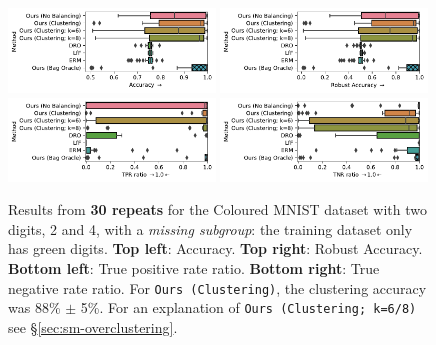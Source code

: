 \begin{figure}[htp]
  \centering
  \includegraphics[width=0.49\textwidth]{supmatch/figures/cmnist/missing_subgroup_oc/cmnist_2v4_miss_s_overcluster_acc.pdf}
  \includegraphics[width=0.49\textwidth]{supmatch/figures/cmnist/missing_subgroup_oc/cmnist_2v4_miss_s_overcluster_acc-min.pdf}
  \includegraphics[width=0.49\textwidth]{supmatch/figures/cmnist/missing_subgroup_oc/cmnist_2v4_miss_s_overcluster_tprr.pdf}
  \includegraphics[width=0.49\textwidth]{supmatch/figures/cmnist/missing_subgroup_oc/cmnist_2v4_miss_s_overcluster_tnrr.pdf}

  \caption{
    Results from \textbf{30 repeats} for the Coloured MNIST dataset with two digits, 2 and 4, with a
    \emph{missing subgroup}: the training dataset only has {\color{green}green} digits.
    \textbf{Top left}: Accuracy.
    \textbf{Top right}: Robust Accuracy.
    \textbf{Bottom left}: True positive rate ratio.
    \textbf{Bottom right}: True negative rate ratio.
    For \texttt{Ours (Clustering)}, the clustering accuracy was 88\% $\pm$ 5\%.
    For an explanation of \texttt{Ours (Clustering; k=6/8)} see \S\ref{sec:sm-overclustering}.
  }%
  \label{fig:cmnist-2v4-miss-s-add}
\end{figure}

